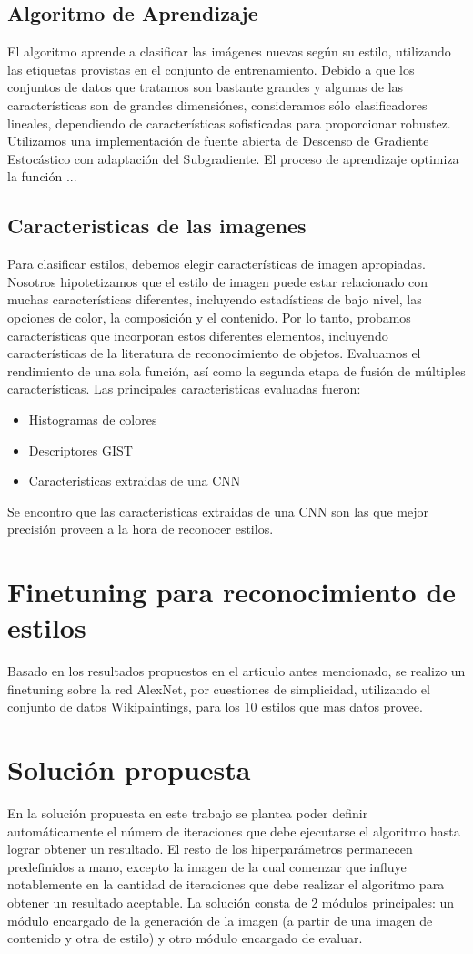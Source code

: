 \documentclass[a4paper,11pt,spanish]{book}
\begin{document}
    \subsection{Algoritmo de Aprendizaje}
      El algoritmo aprende a clasificar las imágenes nuevas según su estilo, utilizando las etiquetas provistas en el conjunto de entrenamiento.
      Debido a que los conjuntos de datos que tratamos son bastante grandes y algunas de las características son de grandes dimensiónes, consideramos sólo clasificadores lineales, 
      dependiendo de características sofisticadas para proporcionar robustez. Utilizamos una implementación de fuente abierta de Descenso de Gradiente Estocástico con adaptación
      del Subgradiente. El proceso de aprendizaje optimiza la función ...
    \subsection{Caracteristicas de las imagenes}
	Para clasificar estilos, debemos elegir características de imagen apropiadas. Nosotros hipotetizamos que el estilo de imagen puede estar relacionado con muchas características diferentes, 
	incluyendo estadísticas de bajo nivel, las opciones de color, la composición y el contenido. Por lo tanto, probamos características que incorporan estos diferentes elementos, incluyendo características de la 
	literatura de reconocimiento de objetos. Evaluamos el rendimiento de una sola función, así como la segunda etapa de fusión de múltiples características.
	Las principales caracteristicas evaluadas fueron:
	\begin{itemize}
	 \item Histogramas de colores
	 \item Descriptores GIST
	 \item Caracteristicas extraidas de una CNN
	\end{itemize}
	Se encontro que las caracteristicas extraidas de una CNN son las que mejor precisión proveen a la hora de reconocer estilos.

  \section{Finetuning para reconocimiento de estilos}
    Basado en los resultados propuestos en el articulo antes mencionado, se realizo un finetuning sobre la red AlexNet, por cuestiones de simplicidad, utilizando
    el conjunto de datos Wikipaintings, para los 10 estilos que mas datos provee.
  
  \section{Solución propuesta}
    En la solución propuesta en este trabajo se plantea poder definir automáticamente el número de iteraciones que debe ejecutarse el algoritmo hasta lograr obtener un resultado.
    El resto de los hiperparámetros permanecen predefinidos a mano, excepto la imagen de la cual comenzar que influye notablemente en la cantidad de iteraciones que debe realizar el 
    algoritmo para obtener un resultado aceptable.
    La solución consta de 2 módulos principales: un módulo encargado de la generación de la imagen (a partir de una imagen de contenido y otra de estilo) y otro módulo encargado de 
    evaluar.
\end{document}
